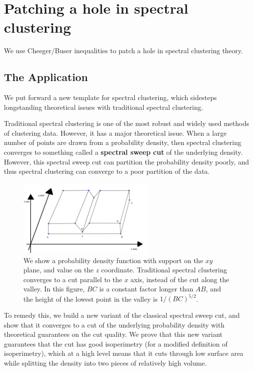 \section{Patching a hole in spectral clustering}
We use Cheeger/Buser inequalities to patch a hole in spectral
clustering theory.
\subsection{The Application}
We put forward a new template for spectral clustering, which sidesteps
longstanding theoretical issues with traditional spectral clustering.

Traditional spectral clustering is one of the most robust and widely
used methods of clustering data. However, it has a major theoretical
issue. When a large number of points are drawn from a probability
density, then spectral clustering converges to something called a
\textbf{spectral sweep cut} of the underlying density.  However, this
spectral sweep cut can partition the probability density poorly, and
thus spectral clustering can converge to a poor partition of the data.

\begin{figure}[htbp]
\centering
\includegraphics[width=0.6\textwidth]{images/counterexample.png}
\caption{
  We show a probability density function with support on the $xy$ plane,
  and value on the $z$ coordinate.  Traditional spectral clustering converges to a cut
  parallel to the $x$ axis, instead of the cut along the valley.
    In this figure,
  $BC$ is a constant
  factor longer than $AB$, and the height of the lowest point in the
  valley is
  $1/(BC)^{5/2}$. 
 }
\label{fig:spec}
\end{figure}

To remedy this, we build a new variant of the classical spectral sweep
cut, and show that it converges to a cut of the underlying probability
density with theoretical guarantees on the cut quality. We prove that
this new variant guarantees that the cut has good isoperimetry (for a
    modified definition of isoperimetry), which at a high level means
that it cuts through low surface area while splitting the density into
two pieces of relatively high volume.


